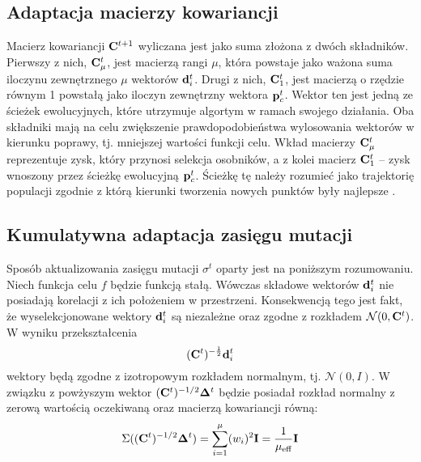 \subsection{Adaptacja macierzy kowariancji \label{CMA}}
  Macierz kowariancji ${\bf C}^{t+1}$ wyliczana jest jako suma złożona z dwóch składników. Pierwszy z nich, ${\bf C}^t_\mu$, jest macierzą rangi $\mu$, która powstaje jako ważona suma iloczynu zewnętrznego $\mu$ wektorów  ${\bf d}_{i}^{t}$. Drugi z nich,  ${\bf C}^t_1$, jest macierzą o rzędzie równym 1 powstałą jako iloczyn zewnętrzny wektora ${\bf p}_c^t$. Wektor ten jest jedną ze ścieżek ewolucyjnych, które utrzymuje algortym w ramach swojego działania. 
  Oba składniki mają na celu zwiększenie prawdopodobieństwa wylosowania wektorów w kierunku poprawy, tj. mniejszej wartości funkcji celu. Wkład macierzy ${\bf C}^t_\mu$ reprezentuje zysk, który przynosi selekcja osobników, a z kolei macierz ${\bf C}^t_1$ -- zysk wnoszony przez ścieżkę ewolucyjną ${\bf p}_c^t$. Ścieżkę tę należy rozumieć jako trajektorię populacji zgodnie z którą kierunki tworzenia nowych punktów były najlepsze \cite{evol-path}.
\subsection{Kumulatywna adaptacja zasięgu mutacji \label{CSA}}
Sposób aktualizowania zasięgu mutacji $\sigma^t$ oparty jest na poniższym rozumowaniu. Niech funkcja celu $f$ będzie funkcją stałą. Wówczas składowe wektorów ${\bf d}_i^t$ nie posiadają korelacji z ich położeniem w przestrzeni.
Konsekwencją tego jest fakt, że wyselekcjonowane wektory  ${\bf d}_i^t$ są niezależne oraz zgodne z rozkładem $\mathcal{N}(0, {\bf C}^{t})$. W wyniku przekształcenia
  \begin{equation}
    ({\bf C}^{t})^{-\frac{1}{2}}{\bf d}_{i}^{t}
  \end{equation}
  wektory będą zgodne z izotropowym rozkładem normalnym, tj. $\mathcal{N}(0, I)$. W związku z powżyszym wektor $({\bf C}^t)^{-1/2} {\bf \Delta}^t$ będzie posiadał rozkład normalny z zerową wartością oczekiwaną
  oraz macierzą kowariancji równą:
  \begin{equation}
    \Sigma(({\bf C}^t)^{-1/2} {\bf \Delta}^t) = \sum_{i=1}^\mu (w_i)^2 {\bf I}=\frac{1}{\mu_\text{eff}} {\bf I}
    \label{eq:01}
  \end{equation}
